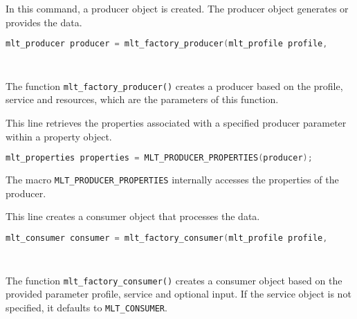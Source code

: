 \documentclass[../MasterThesis.tex]{subfiles}
\begin{document}
\begin{description}[font=\color{RedViolet!80!black}, style=nextline]
	In this command, a producer object is created. The producer object generates or provides the data.

	\begin{lstlisting}[language=C, numbers=none, columns=fullflexible, belowskip=0pt, aboveskip=9pt]
	mlt_producer producer = mlt_factory_producer(mlt_profile profile,
																							const char* service,
																							const void* resource); \end{lstlisting}
																						 
	The function \texttt{mlt\_factory\_producer()} creates a producer based on the profile, service and resources, which are the parameters of this function.


	
	
	\item[Create properties] 
	
	
	This line retrieves the properties associated with a specified producer parameter within a property object.
	
	\begin{lstlisting}[language=C, numbers=none, columns=fullflexible, belowskip=0pt, aboveskip=9pt]
	mlt_properties properties = MLT_PRODUCER_PROPERTIES(producer); \end{lstlisting}
	
	The macro \texttt{MLT\_PRODUCER\_PROPERTIES} internally accesses the properties of the producer.
	
	
	
	\item[Create a consumer] 
	
	This line creates a consumer object that processes the data.
	
	\begin{lstlisting}[language=C, numbers=none, columns=fullflexible, belowskip=0pt, aboveskip=9pt]
	mlt_consumer consumer = mlt_factory_consumer(mlt_profile profile, 
																							const char* service, 
																							const void* input); \end{lstlisting}
																
	The function \texttt{mlt\_factory\_consumer()} creates a consumer object based on the provided parameter profile, service and optional input. If the service object is not specified, it defaults to \texttt{MLT\_CONSUMER}.
											
																
	

\end{description}
\end{document}
